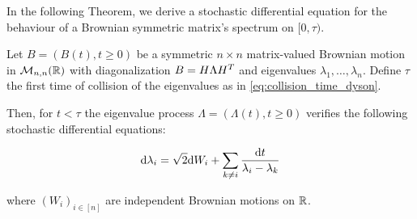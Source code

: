 In the following Theorem, we derive a stochastic differential equation for the behaviour of a Brownian symmetric matrix's spectrum on $[0,\tau)$.

\begin{theorem} \label{thm:dyson_real}
    Let $B = (B(t), t \ge 0)$ be a symmetric $n\times n$ matrix-valued Brownian motion in $\mathcal M_{n,n}(\mathbb R)$ with diagonalization $B = H \Lambda H^T$ and eigenvalues $\lambda_1, \dots, \lambda_n$. Define $\tau$ the first time of collision of the eigenvalues as in \eqref{eq:collision_time_dyson}.
    
    Then, for $t < \tau$ the eigenvalue process $\Lambda = (\Lambda(t), t\ge 0)$ verifies the following stochastic differential equations:

    \begin{equation}
        \mathrm d \lambda_i = \sqrt{2}\mathrm d W_i + \sum_{k\neq i} \frac{\mathrm d t}{\lambda_i - \lambda_k}
    \end{equation}

    \noindent where $(W_i)_{i\in[n]}$ are independent Brownian motions on $\mathbb R$.
\end{theorem}

